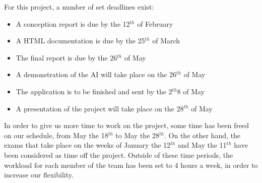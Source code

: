 For this project, a number of set deadlines exist:
\begin{itemize}
	\item A conception report is due by the 12$^{th}$  of February
	\item A HTML documentation is due by the 25$^{th}$ of March
	\item The final report  is due by the 26$^{th}$ of May
	\item A demonstration of the AI will take place on the 26$^{th}$ of May
	\item The application is to be finished and sent by the 2$^{th}$8 of May
	\item A presentation of the project will take place on the 28$^{th}$ of May
\end{itemize}

In order to give us more time to work on the project, some time has been freed on our schedule, from May the 18$^{th}$ to May the 28$^{th}$.
On the other hand, the exams that take place on the weeks of January the 12$^{th}$ and May the 11$^{th}$ have been considered as time off the project. 
Outside of these time periods, the workload for each member of the team has been set to 4 hours a week, in order to increase our flexibility.
